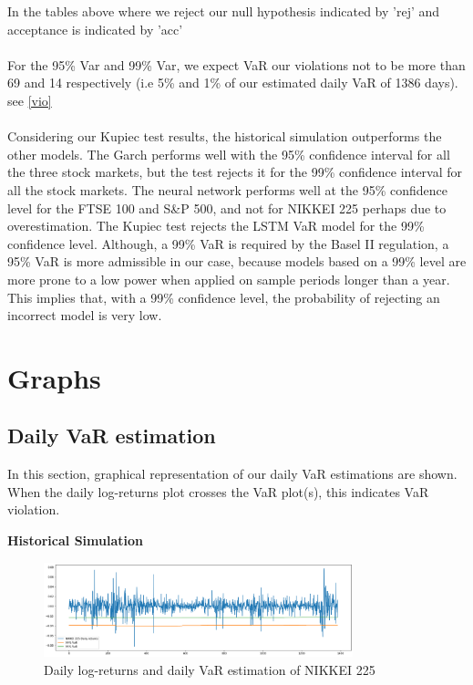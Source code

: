 \documentclass[a4paper,11pt,oneside]{book}
\begin{document}
In the tables above where we reject our null hypothesis indicated by 'rej' and acceptance is indicated by 'acc'\\\\
For the 95\% Var and 99\% Var, we expect VaR our violations not to be more than 69 and 14 respectively (i.e 5\% and 1\% of our estimated daily VaR of 1386 days). see \autoref{vio}  \\\\
Considering our Kupiec test results, the historical simulation outperforms the other models. The Garch performs well with the 95\% confidence interval for all the three stock markets, but the test rejects it for the 99\% confidence interval for all the stock markets. The neural network performs well at the 95\% confidence level for the FTSE 100 and S\&P 500, and not for NIKKEI 225 perhaps due to overestimation. The Kupiec test rejects the LSTM VaR model for the 99\% confidence level. Although, a 99\% VaR
is required by the Basel II regulation, a 95\% VaR is more admissible in our case,
because models based on a 99\% level are more prone to a low power when
applied on sample periods longer than a year. This implies that, with a 99\%
confidence level, the probability of rejecting an incorrect model is very low.























\section{Graphs}
\subsection{Daily VaR estimation}
In this section, graphical representation of our daily VaR estimations are shown. When the daily log-returns plot crosses the VaR plot(s), this indicates VaR violation. \newline

\textbf{Historical Simulation}
\begin{figure}[!h]
	\centering
	\includegraphics[width=0.8\textwidth]{figures/HISTN}
	\caption{Daily log-returns and daily VaR estimation of NIKKEI 225}
	\label{HistN}
\end{figure}
\end{document}
